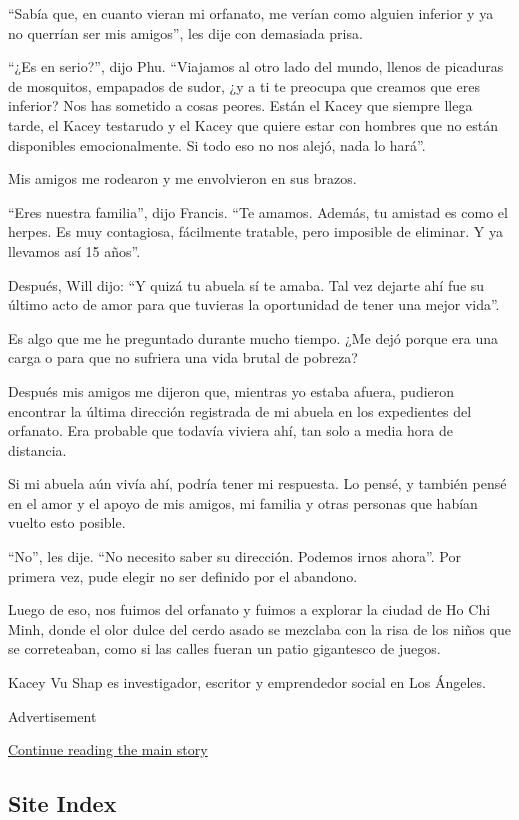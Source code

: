 ``Sabía que, en cuanto vieran mi orfanato, me verían como alguien
inferior y ya no querrían ser mis amigos'', les dije con demasiada
prisa.

``¿Es en serio?'', dijo Phu. ``Viajamos al otro lado del mundo, llenos
de picaduras de mosquitos, empapados de sudor, ¿y a ti te preocupa que
creamos que eres inferior? Nos has sometido a cosas peores. Están el
Kacey que siempre llega tarde, el Kacey testarudo y el Kacey que quiere
estar con hombres que no están disponibles emocionalmente. Si todo eso
no nos alejó, nada lo hará''.

Mis amigos me rodearon y me envolvieron en sus brazos.

``Eres nuestra familia'', dijo Francis. ``Te amamos. Además, tu amistad
es como el herpes. Es muy contagiosa, fácilmente tratable, pero
imposible de eliminar. Y ya llevamos así 15 años''.

Después, Will dijo: ``Y quizá tu abuela sí te amaba. Tal vez dejarte ahí
fue su último acto de amor para que tuvieras la oportunidad de tener una
mejor vida''.

Es algo que me he preguntado durante mucho tiempo. ¿Me dejó porque era
una carga o para que no sufriera una vida brutal de pobreza?

Después mis amigos me dijeron que, mientras yo estaba afuera, pudieron
encontrar la última dirección registrada de mi abuela en los expedientes
del orfanato. Era probable que todavía viviera ahí, tan solo a media
hora de distancia.

Si mi abuela aún vivía ahí, podría tener mi respuesta. Lo pensé, y
también pensé en el amor y el apoyo de mis amigos, mi familia y otras
personas que habían vuelto esto posible.

``No'', les dije. ``No necesito saber su dirección. Podemos irnos
ahora''. Por primera vez, pude elegir no ser definido por el abandono.

Luego de eso, nos fuimos del orfanato y fuimos a explorar la ciudad de
Ho Chi Minh, donde el olor dulce del cerdo asado se mezclaba con la risa
de los niños que se correteaban, como si las calles fueran un patio
gigantesco de juegos.

Kacey Vu Shap es investigador, escritor y emprendedor social en Los
Ángeles.

Advertisement

\protect\hyperlink{after-bottom}{Continue reading the main story}

\hypertarget{site-index}{%
\subsection{Site Index}\label{site-index}}

